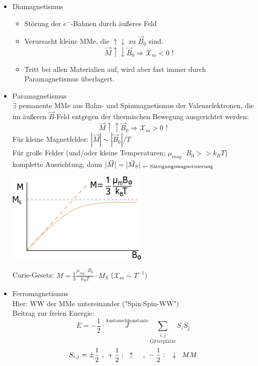 \begin{itemize}
	\item Diamagnetismus\\
	\begin{itemize}
		\item Störung der $ e^- $-Bahnen durch äußeres Feld
		\item Verursacht kleine MMe, die $ \uparrow \downarrow $ zu $ \vec{B}_0 $ sind.
		$$ \vec{M}  \uparrow \downarrow  \vec{B}_0 \Rightarrow \mathcal{X}_m <0 \text{ !} $$
		\item Tritt bei allen Materialien auf, wird aber fast immer durch Paramagnetismus überlagert.
	\end{itemize}
	\item Paramagnetismus\\
	$ \exists $ pemanente MMe aus Bahn- und Spinmagnetismus der Valenzelektronen, die im äußeren $ \vec{B} $-Feld entgegen der thermischen Bewegung ausgerichtet werden:
	$$ \vec{M} \uparrow\uparrow \vec{B}_0 \Rightarrow \mathcal{X}_m > 0 \text{ !}$$ 
	Für kleine Magnetfelder: $ |\vec{M}| \sim |\vec{B}_0|/T$ \\
	Für große Felder (und/oder kleine Temperaturen; $ \mu_{mag} \cdot B_0 >> k_BT $) komplette Ausrichtung, dann $ |\vec{M}| = |\vec{M}_S|_{\text{ $ \leftarrow $  Sättigungsmagnetisierung}} $\\
	\begin{center}
		\includegraphics[width=0.5\linewidth]{skizzen/17/17B05}
	\end{center}
	Curie-Gesetz: $ M = \frac{1}{3} \frac{\mu_{mg}\cdot B_0}{k_BT} \cdot M_S $ \hspace{1cm} ($ \mathcal{X}_m \sim T^{-1}$)
	\item Ferromagnetismus\\
	Hier: WW der MMe untereinander ("Spin$ \cdot $Spin-WW")\\
	Beitrag zur freien Energie: \\
	$$ E = -\frac{1}{2} \cdot \overset{\text{Austauschkonstante}}{J} \underset{\text{Gitterplätze}}{\sum_{i,j}} S_i S_j $$
	$$ S_{i,j} = \pm \frac{1}{2}\text{ , } +\frac{1}{2}: \hspace{3mm}\uparrow \hspace{3mm} \text{ , } -\frac{1}{2}: \hspace{3mm}\textbf{$ \downarrow $} \hspace{3mm} MM$$\\

\end{itemize}

